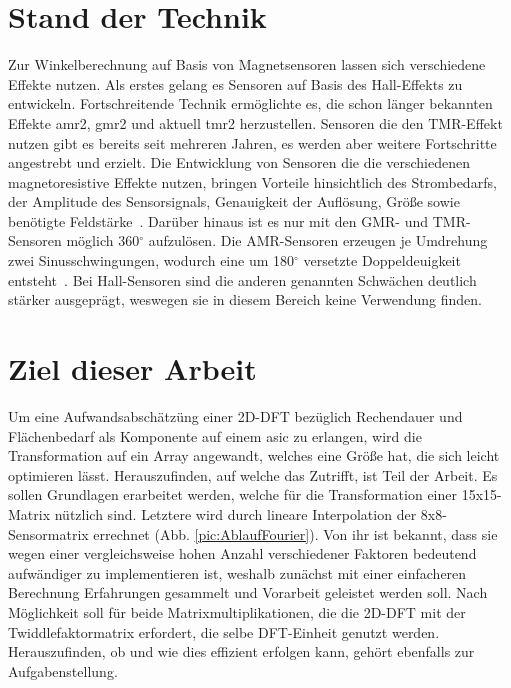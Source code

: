 \section{Stand der Technik}

Zur Winkelberechnung auf Basis von Magnetsensoren lassen sich verschiedene Effekte nutzen. Als erstes gelang es Sensoren auf Basis des Hall-Effekts zu entwickeln. Fortschreitende Technik ermöglichte es, die schon länger bekannten Effekte \gls{amr2}, \gls{gmr2} und aktuell \gls{tmr2} herzustellen. Sensoren die den TMR-Effekt nutzen gibt es bereits seit mehreren Jahren, es werden aber weitere Fortschritte angestrebt und erzielt. 
Die Entwicklung von Sensoren die die verschiedenen magnetoresistive Effekte nutzen, bringen Vorteile hinsichtlich des Strombedarfs, der Amplitude des Sensorsignals, Genauigkeit der Auflösung, Größe sowie benötigte Feldstärke~\autocite[2]{magSensTechOverview}. Darüber hinaus ist es nur mit den GMR- und TMR-Sensoren möglich 360${}^\circ$ aufzulösen. Die AMR-Sensoren erzeugen je Umdrehung zwei Sinusschwingungen, wodurch eine um 180${}^\circ$ versetzte Doppeldeuigkeit entsteht~\autocite{tsukakoshi2017tmrgmr}. Bei Hall-Sensoren sind die anderen genannten Schwächen deutlich stärker ausgeprägt, weswegen sie in diesem Bereich keine Verwendung finden.






\section{Ziel dieser Arbeit}
Um eine Aufwandsabschätzüng einer 2D-DFT bezüglich Rechendauer und Flächenbedarf als Komponente auf einem  \gls{asic} zu erlangen, wird die Transformation auf ein Array angewandt, welches eine Größe 
hat, die sich leicht optimieren lässt. Herauszufinden, auf welche das Zutrifft, ist Teil der Arbeit. 
Es sollen Grundlagen erarbeitet werden, welche für die Transformation einer
15x15-Matrix nützlich sind. Letztere wird durch lineare Interpolation der 8x8-Sensormatrix errechnet (Abb. \ref{pic:AblaufFourier}). Von ihr ist bekannt, dass sie wegen einer vergleichsweise hohen Anzahl verschiedener Faktoren bedeutend
aufwändiger zu implementieren ist, weshalb zunächst mit einer einfacheren Berechnung Erfahrungen gesammelt und Vorarbeit geleistet werden soll.
Nach Möglichkeit soll für beide Matrixmultiplikationen, die die 2D-DFT mit der Twiddlefaktormatrix erfordert, die selbe DFT-Einheit genutzt werden. Herauszufinden, ob und wie dies effizient erfolgen kann,
gehört ebenfalls zur Aufgabenstellung.
